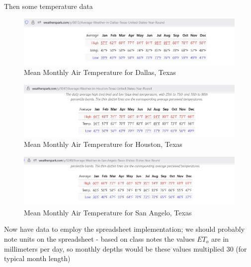 \documentclass[12pt]{article}
\begin{document}
\begin{enumerate}
Then some temperature data

\begin{figure}[h!] %
   \centering
   \includegraphics[width=6in]{mmtdallas.png} 
   \caption{Mean Monthly Air Temperature for Dallas, Texas}
   \label{fig:mmtdallas}
\end{figure}

\begin{figure}[h!] %
   \centering
   \includegraphics[width=6in]{houstonmmt.png} 
   \caption{Mean Monthly Air Temperature for Houston, Texas}
   \label{fig:mmthouston}
\end{figure}

\begin{figure}[h!] %
   \centering
   \includegraphics[width=6in]{mmtsanangelo.png} 
   \caption{Mean Monthly Air Temperature for San Angelo, Texas}
   \label{fig:mmtsanangelo}
\end{figure}

Now have data to employ the spreadsheet implementation; we should probably note units on the spreadsheet - based on class notes the values $ET_o$ are in millimeters per day, so monthly depths would be these values multiplied 30 (for typical month length)


\end{enumerate}
\end{document}
